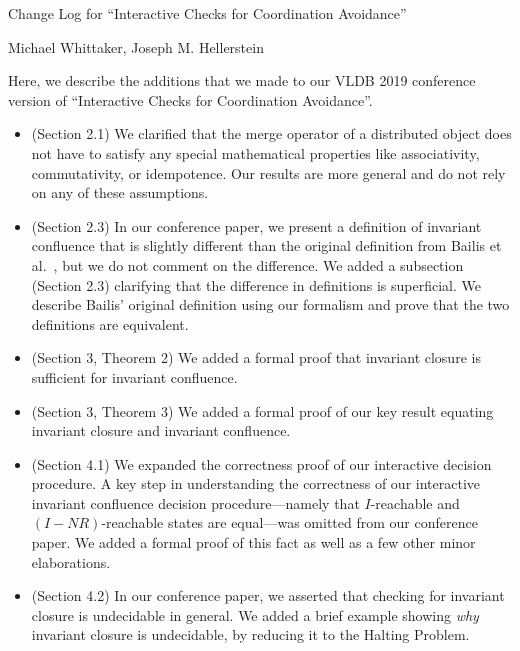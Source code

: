 \documentclass[12pt]{article}
\begin{document}
\begin{center}
  {\huge Change Log for ``Interactive Checks for Coordination Avoidance''}

  Michael Whittaker, Joseph M. Hellerstein
\end{center}

Here, we describe the additions that we made to our VLDB 2019 conference
version of ``Interactive Checks for Coordination Avoidance''.

\begin{itemize}
  \item (Section 2.1)
    We clarified that the merge operator of a distributed object does not have
    to satisfy any special mathematical properties like associativity,
    commutativity, or idempotence. Our results are more general and do not rely
    on any of these assumptions.

  \item (Section 2.3)
    In our conference paper, we present a definition of invariant confluence
    that is slightly different than the original definition from Bailis et
    al.~\cite{bailis2014coordination}, but we do not comment on the difference.
    We added a subsection (Section 2.3) clarifying that the difference in
    definitions is superficial. We describe Bailis' original definition using
    our formalism and prove that the two definitions are equivalent.

  \item (Section 3, Theorem 2)
    We added a formal proof that invariant closure is sufficient for invariant
    confluence.

  \item (Section 3, Theorem 3)
    We added a formal proof of our key result equating invariant closure and
    invariant confluence.

  \item (Section 4.1)
    We expanded the correctness proof of our interactive decision procedure. A
    key step in understanding the correctness of our interactive invariant
    confluence decision procedure---namely that $I$-reachable and
    $(I-NR)$-reachable states are equal---was omitted from our conference
    paper. We added a formal proof of this fact as well as a few other minor
    elaborations.

  \item (Section 4.2)
    In our conference paper, we asserted that checking for invariant closure is
    undecidable in general. We added a brief example showing \emph{why}
    invariant closure is undecidable, by reducing it to the Halting Problem.


\end{itemize}
\end{document}
